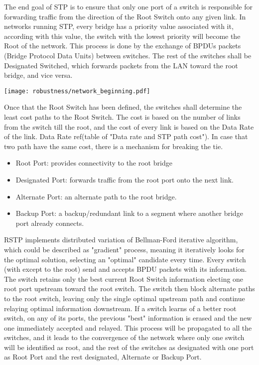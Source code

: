 The end goal of STP is to ensure that only one port of a switch is responsible 
for forwarding traffic from the direction of the Root Switch onto any given
link. In networks running STP, every bridge has a priority value associated with
it, according with this value, the switch with the lowest priority will become
the Root of the network.  This process is done by the exchange of BPDUs packets
(Bridge Protocol Data Units) between switches. The rest of the switches shall be
Designated Switched, which forwards packets from the LAN toward the root bridge,
and vice versa.

\begin{center}
        \texttt{[image: robustness/network\_beginning.pdf]}
        \label{fig:redunt_net}
\end{center}


Once that the Root Switch has been defined, the switches shall determine
the least cost paths to the Root Switch. The cost is based on the number of
links from the switch till the root, and the cost of every link is based on the
Data Rate of the link. Data Rate ref(table of "Data rate and STP path cost"). In
case that two path have the same cost, there is a mechanism for breaking the
tie.

\begin{itemize}
        \item Root Port: provides connectivity to the root bridge
        \item Designated Port: forwards traffic from the root port onto the
next link.
        \item Alternate Port: an alternate path to the root bridge.
        \item Backup Port: a backup/redundant link to a segment where
another bridge port already connects.
\end{itemize}


RSTP implements distributed variation of Bellman-Ford iterative
algorithm, which could be described as "gradient" process, meaning it iteratively looks for the
optimal solution, selecting an "optimal" candidate every time. Every switch
(with except to the root) send and  accepts BPDU packets
with its information. The switch retains only the best current Root Switch
information electing one root port upstream toward the root switch. The switch
then block alternate paths to the root switch, leaving only the single optimal
upstream path and continue relaying optimal information downstream. If a switch
learns of a better root switch, on any of its ports, the previous "best"
information is erased and the new one immediately accepted and relayed. This
process will be propagated to all the switches, and it leads to the convergence
of the network where only one switch will be identified as root, and the rest of
the switches as designated with one port as Root Port and the rest designated,
Alternate or Backup Port.


